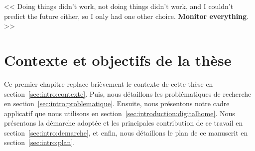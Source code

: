 \begin{savequote}[6cm]
<< Doing things didn't work, not doing things didn't work, and I couldn't predict the future either, so I only had one other choice. \textbf{Monitor everything}. >>
\end{savequote}
\chapter{Contexte et objectifs de la thèse}
\chaptertoc

Ce premier chapitre replace brièvement le contexte de cette thèse en section~\ref{sec:intro:contexte}. Puis, nous détaillons les problématiques de recherche en section~\ref{sec:intro:problematique}. Ensuite, nous présentons notre cadre applicatif que nous utilisons en section~\ref{sec:introduction:digitalhome}. Nous présentons la démarche adoptée et les principales contribution de ce travail en section~\ref{sec:intro:demarche}, et enfin, nous détaillons le plan de ce manuscrit en section~\ref{sec:intro:plan}.







